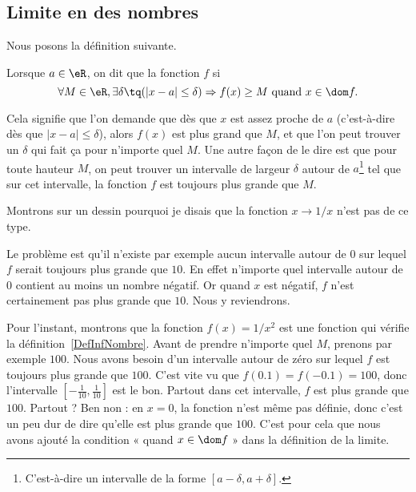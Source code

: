 \subsection{Limite en des nombres}

Nous posons la définition suivante.
\begin{definition}      \label{DefInfNombre}
Lorsque $a\in\eR$, on dit que la fonction $f$  si
\[
  \forall M\in\eR,\exists \delta\tq (| x-a |\leq \delta )\Rightarrow f(x)\geq M\text{ quand }x\in\dom f.
\]
\end{definition}
Cela signifie que l'on demande que dès que $x$ est assez proche de $a$ (c'est-à-dire dès que $| x-a |\leq\delta$), alors $f(x)$ est plus grand que $M$, et que l'on peut trouver un $\delta$ qui fait ça pour n'importe quel $M$. Une autre façon de le dire est que pour toute hauteur $M$, on peut trouver un intervalle de largeur $\delta$ autour de $a$\footnote{C'est-à-dire un intervalle de la forme $[a-\delta,a+\delta]$.} tel que sur cet intervalle, la fonction $f$ est toujours plus grande que $M$.

Montrons sur un dessin pourquoi je disais que la fonction $x\to 1/x$ n'est pas de ce type.


Le problème est qu'il n'existe par exemple aucun intervalle autour de $0$ sur lequel $f$ serait toujours plus grande que $10$. En effet n'importe quel intervalle autour de $0$ contient au moins un nombre négatif. Or quand $x$ est négatif, $f$ n'est certainement pas plus grande que $10$. Nous y reviendrons.

Pour l'instant, montrons que la fonction $f(x)=1/x^2$ est une fonction qui vérifie la définition~\ref{DefInfNombre}.  Avant de prendre n'importe quel $M$, prenons par exemple $100$. Nous avons besoin d'un intervalle autour de zéro sur lequel $f$ est toujours plus grande que $100$. C'est vite vu que $f(0.1)=f(-0.1)=100$, donc l'intervalle $[-\frac{ 1 }{ 10 },\frac{1}{ 10 }]$ est le bon. Partout dans cet intervalle, $f$ est plus grande que $100$. Partout ? Ben non : en $x=0$, la fonction n'est même pas définie, donc c'est un peu dur de dire qu'elle est plus grande que $100$. C'est pour cela que nous avons ajouté la condition « quand $x\in\dom f$ » dans la définition de la limite.

